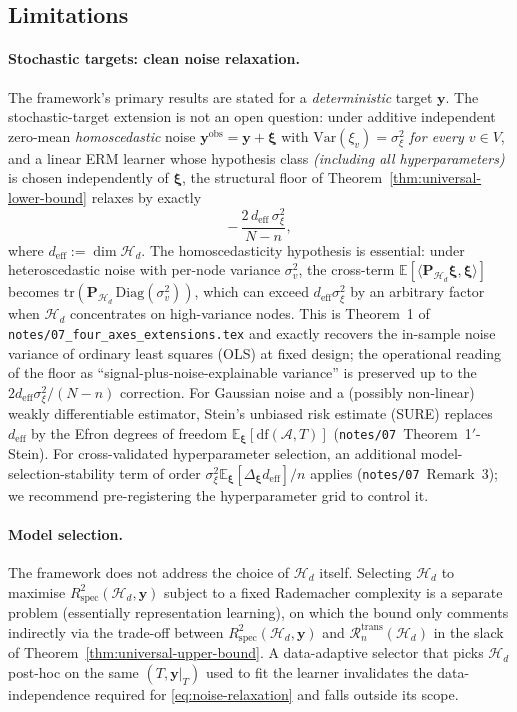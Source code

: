 \documentclass[11pt,a4paper]{article}
\theoremstyle{plain}
\theoremstyle{definition}
\theoremstyle{remark}
\newcommand{\by}{\mathbf{y}}
\newcommand{\bP}{\mathbf{P}}
\newcommand{\bxi}{\boldsymbol{\xi}}
\newcommand{\df}{\mathrm{df}}
\newcommand{\E}{\mathbb{E}}
\newcommand{\Var}{\mathrm{Var}}
\newcommand{\tr}{\mathrm{tr}}
\newcommand{\Rspec}{R^2_{\mathrm{spec}}}
\newcommand{\Acal}{\mathcal{A}}
\newcommand{\Hcal}{\mathcal{H}}
\begin{document}
\subsection{Limitations}
\label{subsec:limitations}

\paragraph{Stochastic targets: clean noise relaxation.}
The framework's primary results are stated for a
\emph{deterministic} target $\by$. The stochastic-target extension
is not an open question: under additive independent zero-mean
\emph{homoscedastic} noise $\by^{\mathrm{obs}} = \by + \bxi$ with
$\Var(\xi_v) = \sigma_\xi^2$ \emph{for every $v \in V$}, and a
linear ERM learner whose hypothesis class
\emph{(including all hyperparameters)} is chosen independently of
$\bxi$, the structural floor of
Theorem~\ref{thm:universal-lower-bound} relaxes by exactly
\begin{equation}
    -\,\frac{2\, d_{\mathrm{eff}}\, \sigma_\xi^2}{N - n},
    \label{eq:noise-relaxation}
\end{equation}
where $d_{\mathrm{eff}} := \dim \Hcal_d$. The homoscedasticity
hypothesis is essential: under heteroscedastic noise with
per-node variance $\sigma_v^2$, the cross-term $\E[\langle
\bP_{\Hcal_d}\bxi, \bxi\rangle]$ becomes
$\tr(\bP_{\Hcal_d}\,\mathrm{Diag}(\sigma_v^2))$, which can exceed
$d_{\mathrm{eff}} \sigma_\xi^2$ by an arbitrary factor when
$\Hcal_d$ concentrates on high-variance nodes. This is
Theorem~1 of
\texttt{notes/07\_four\_axes\_extensions.tex} and exactly recovers
the in-sample noise variance of ordinary least squares (OLS) at fixed
design; the
operational reading of the floor as
``signal-plus-noise-explainable variance'' is preserved up to the
$2 d_{\mathrm{eff}} \sigma_\xi^2/(N-n)$ correction. For Gaussian
noise and a (possibly non-linear) weakly differentiable estimator,
Stein's unbiased risk estimate (SURE) replaces $d_{\mathrm{eff}}$ by
the Efron
degrees of freedom $\E_{\bxi}[\df(\Acal, T)]$
(\texttt{notes/07}~Theorem~1$'$-Stein). For cross-validated
hyperparameter selection, an additional model-selection-stability
term of order $\sigma_\xi^2 \E_{\bxi}[\Delta_{\bxi}
d_{\mathrm{eff}}]/n$ applies (\texttt{notes/07}~Remark~3); we
recommend pre-registering the hyperparameter grid to control it.

\paragraph{Model selection.}
The framework does not address the choice of $\Hcal_d$ itself.
Selecting $\Hcal_d$ to maximise $\Rspec(\Hcal_d, \by)$ subject to a
fixed Rademacher complexity is a separate problem (essentially
representation learning), on which the bound only comments
indirectly via the trade-off between $\Rspec(\Hcal_d, \by)$ and
$\mathcal{R}^{\mathrm{trans}}_n(\Hcal_d)$ in the slack of
Theorem~\ref{thm:universal-upper-bound}. A data-adaptive selector
that picks $\Hcal_d$ post-hoc on the same $(T, \by|_T)$ used to fit
the learner invalidates the data-independence required for
\eqref{eq:noise-relaxation} and falls outside its scope.
\end{document}
